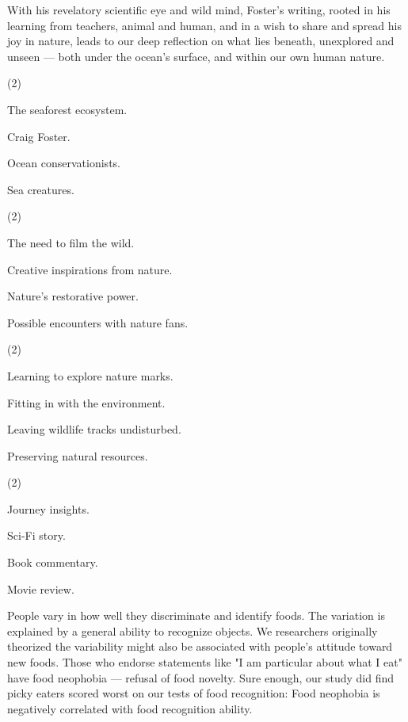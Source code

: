 \documentclass{英语试卷}
\begin{document}
\par With his revelatory scientific eye and wild mind, Foster's writing, rooted in his learning from teachers, animal and human, and in a wish to share and spread his joy in nature, leads to our deep reflection on what lies beneath, unexplored and unseen — both under the ocean's surface, and within our own human nature.\par
{}
\begin{choices}(2)
  \item The seaforest ecosystem.
  \item Craig Foster.
  \item Ocean conservationists.
  \item Sea creatures.
\end{choices}
\begin{choices}(2)
  \item The need to film the wild.
  \item Creative inspirations from nature.
  \item Nature's restorative power.
  \item Possible encounters with nature fans.
\end{choices}
\begin{choices}(2)
  \item Learning to explore nature marks.
  \item Fitting in with the environment.
  \item Leaving wildlife tracks undisturbed.
  \item Preserving natural resources.
\end{choices}
\begin{choices}(2)
  \item Journey insights.
  \item Sci-Fi story.
  \item Book commentary.
  \item Movie review.
\end{choices}
\par People vary in how well they discriminate and identify foods. The variation is explained by a general ability to recognize objects. We researchers originally theorized the variability might also be associated with people's attitude toward new foods. Those who endorse statements like "I am particular about what I eat" have food neophobia — refusal of food novelty. Sure enough, our study did find picky eaters scored worst on our tests of food recognition: Food neophobia is negatively correlated with food recognition ability.\par
\end{document}

